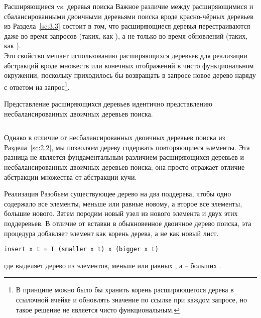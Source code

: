\begin{frame}[fragile]{Расширяющиеся vs. деревья поиска}
Важное различие между расширяющимися и сбалансированными
двоичными деревьями поиска вроде красно-чёрных деревьев из
Раздела~\ref{sc:3.3} состоит в том, что расширяющиеся деревья
перестраиваются даже во время запросов (таких, как ),
а не только во время обновлений (таких, как ). \\

Это
свойство мешает использованию расширяющихся деревьев для реализации
абстракций вроде множеств или конечных отображений в чисто
функциональном окружении, поскольку приходилось бы возвращать в
запросе новое дерево наряду с ответом на запрос\footnote{%
  В принципе можно было бы хранить корень расширяющегося дерева в
  ссылочной ячейке и обновлять значение по ссылке при каждом запросе, но
  такое решение не является чисто функциональным.
}.
\end{frame}


\begin{frame}[fragile]{}
Представление расширяющихся деревьев идентично представлению
несбалансированных двоичных деревьев поиска.
\inputminted[firstline=5,lastline=5] {haskell}{code/SplayHeap.lhs}


Однако в отличие от несбалансированных двоичных деревьев поиска из
Раздела~\ref{sc:2.2}, мы позволяем дереву содержать повторяющиеся
элементы. Эта разница не является фундаментальным различием расширяющихся
деревьев и несбалансированных двоичных деревьев поиска; она просто
отражает отличие абстракции множества от абстракции кучи.

\end{frame}


\begin{frame}[fragile]{Реализация  }
Разобьем существующее дерево на два поддерева, чтобы одно содержало все
элементы, меньше или равные новому, а второе все элементы, большие
нового. Затем породим новый узел из нового элемента и двух этих
поддеревьев. В отличие от вставки в обыкновенное двоичное дерево
поиска, эта процедура добавляет элемент как корень дерева, а не как
новый лист.

\begin{verbatim}
insert x t = T (smaller x t) x (bigger x t)
\end{verbatim}

где  выделяет дерево из элементов, меньше или равных
, а  -- больших
. 

\end{frame}


